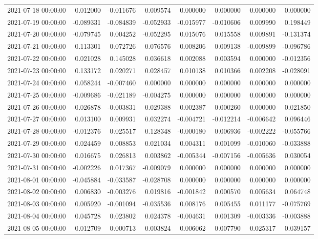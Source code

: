 \begin{tabular}{lrrrrrrr}
2021-07-18 00:00:00 & 0.012000 & -0.011676 & 0.009574 & 0.000000 & 0.000000 & 0.000000 & 0.000000 \\
2021-07-19 00:00:00 & -0.089331 & -0.084839 & -0.052933 & -0.015977 & -0.010606 & 0.009990 & 0.198449 \\
2021-07-20 00:00:00 & -0.079745 & 0.004252 & -0.052295 & 0.015076 & 0.015558 & 0.009891 & -0.131374 \\
2021-07-21 00:00:00 & 0.113301 & 0.072726 & 0.076576 & 0.008206 & 0.009138 & -0.009899 & -0.096786 \\
2021-07-22 00:00:00 & 0.021028 & 0.145028 & 0.036618 & 0.002088 & 0.003594 & 0.000000 & -0.012356 \\
2021-07-23 00:00:00 & 0.133172 & 0.020271 & 0.028457 & 0.010138 & 0.010366 & 0.002208 & -0.028091 \\
2021-07-24 00:00:00 & 0.058244 & -0.007460 & 0.000000 & 0.000000 & 0.000000 & 0.000000 & 0.000000 \\
2021-07-25 00:00:00 & -0.009686 & -0.021189 & -0.004275 & 0.000000 & 0.000000 & 0.000000 & 0.000000 \\
2021-07-26 00:00:00 & -0.026878 & -0.003831 & 0.029388 & 0.002387 & 0.000260 & 0.000000 & 0.021850 \\
2021-07-27 00:00:00 & 0.013100 & 0.009931 & 0.032274 & -0.004721 & -0.012214 & -0.006642 & 0.096446 \\
2021-07-28 00:00:00 & -0.012376 & 0.025517 & 0.128348 & -0.000180 & 0.006936 & -0.002222 & -0.055766 \\
2021-07-29 00:00:00 & 0.024459 & 0.008853 & 0.021034 & 0.004311 & 0.001099 & -0.010060 & -0.033888 \\
2021-07-30 00:00:00 & 0.016675 & 0.026813 & 0.003862 & -0.005344 & -0.007156 & -0.005636 & 0.030054 \\
2021-07-31 00:00:00 & -0.002226 & 0.017367 & -0.009079 & 0.000000 & 0.000000 & 0.000000 & 0.000000 \\
2021-08-01 00:00:00 & -0.045884 & -0.033587 & -0.028708 & 0.000000 & 0.000000 & 0.000000 & 0.000000 \\
2021-08-02 00:00:00 & 0.006830 & -0.003276 & 0.019816 & -0.001842 & 0.000570 & 0.005634 & 0.064748 \\
2021-08-03 00:00:00 & 0.005920 & -0.001094 & -0.035536 & 0.008176 & 0.005455 & 0.011177 & -0.075769 \\
2021-08-04 00:00:00 & 0.045728 & 0.023802 & 0.024378 & -0.004631 & 0.001309 & -0.003336 & -0.003888 \\
2021-08-05 00:00:00 & 0.012709 & -0.000713 & 0.003824 & 0.006062 & 0.007790 & 0.025317 & -0.039157 \\

\end{tabular}
